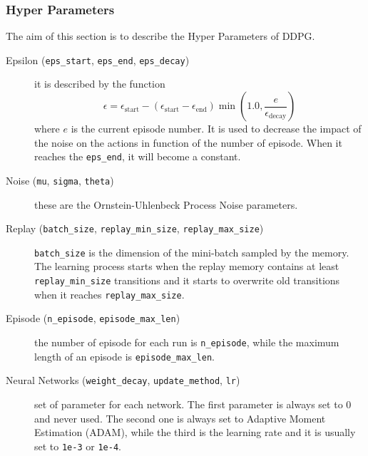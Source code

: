 \documentclass[a4paper, 11pt]{article}
\begin{document}
	\subsubsection{Hyper Parameters}
	The aim of this section is to describe the Hyper Parameters of DDPG.
	
	\begin{description}
		\item[Epsilon (\texttt{eps\_start}, \texttt{eps\_end}, \texttt{eps\_decay})] it is described by the function \[\epsilon = \epsilon_{\text{start}} - (\epsilon_{\text{start}} -\epsilon_{\text{end}})\min(1.0, \frac{e}{\epsilon_{\text{decay}}})\] where $e$ is the current episode number. It is used to decrease the impact of the noise on the actions in function of the number of episode. When it reaches the \texttt{eps\_end}, it will become a constant.
		
		
		\item[Noise (\texttt{mu}, \texttt{sigma}, \texttt{theta})] these are the Ornstein-Uhlenbeck Process Noise parameters.
		
		
		\item[Replay (\texttt{batch\_size}, \texttt{replay\_min\_size}, \texttt{replay\_max\_size})] \texttt{batch\_size} is the dimension of the mini-batch sampled by the memory. The learning process starts when the replay memory contains at least \texttt{replay\_min\_size} transitions and it starts to overwrite old transitions when it reaches \texttt{replay\_max\_size}.
		
		
		\item[Episode (\texttt{n\_episode}, \texttt{episode\_max\_len})] the number of episode for each run is \texttt{n\_episode}, while the maximum length of an episode is \texttt{episode\_max\_len}.
		
		
		\item[Neural Networks (\texttt{weight\_decay}, \texttt{update\_method}, \texttt{lr})] set of parameter for each network. The first parameter is always set to 0 and never used. The second one is always set to Adaptive Moment Estimation (ADAM), while the third is the learning rate and it is usually set to \texttt{1e-3} or \texttt{1e-4}.
		

\end{description}
\end{document}
